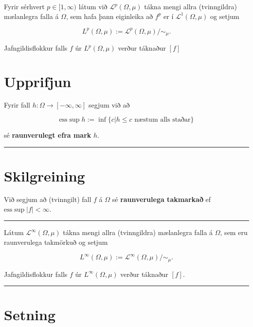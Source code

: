 \documentclass[]{book}
\begin{document}
Fyrir sérhvert \(p\in[1,\infty)\) látum við \(\mathcal L^p(\Omega,\mu)\) tákna mengi allra (tvinngildra) mælanlegra falla á \(\Omega\), sem hafa þann eiginleika að \(f^p\) er í \(\mathcal L^1(\Omega,\mu)\) og setjum

\[
L^p(\Omega,\mu) := \mathcal L^p(\Omega,\mu)/\sim_\mu.
\]

Jafngildisflokkur falls \(f\) úr \(L^p(\Omega,\mu)\) verður táknaður \([f]\)

\hypertarget{upprifjun-1}{%
\section*{Upprifjun}\label{upprifjun-1}}

Fyrir fall \(h:\Omega\rightarrow[-\infty,\infty]\) segjum við að

\[
\text{ess}\sup h := \inf\{c|h\leq c \text{ næstum alls staðar}\}
\]

sé \textbf{raunverulegt efra mark} \(h\).

\begin{center}\rule{0.5\linewidth}{\linethickness}\end{center}

\hypertarget{skilgreining-24}{%
\section*{Skilgreining}\label{skilgreining-24}}

Við segjum að (tvinngilt) fall \(f\) á \(\Omega\) sé \textbf{raunverulega takmarkað} ef \(\text{ess}\sup|f| < \infty\).

\begin{center}\rule{0.5\linewidth}{\linethickness}\end{center}

Látum \(\mathcal L^\infty(\Omega,\mu)\) tákna mengi allra (tvinngildra) mælanlegra falla á \(\Omega\), sem eru raunverulega takmörkuð og setjum

\[
L^\infty(\Omega,\mu) := \mathcal L^\infty(\Omega,\mu)/\sim_\mu.
\]

Jafngildisflokkur falls \(f\) úr \(L^\infty(\Omega,\mu)\) verður táknaður \([f]\).

\begin{center}\rule{0.5\linewidth}{\linethickness}\end{center}

\hypertarget{setning-68}{%
\section*{Setning}\label{setning-68}}
\end{document}
